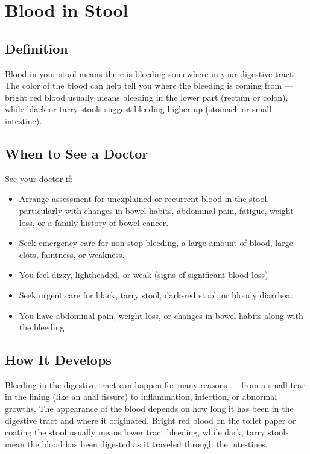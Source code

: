 \chapter{Blood in Stool}

\section*{Definition}
Blood in your stool means there is bleeding somewhere in your digestive tract. The color of the blood can help tell you where the bleeding is coming from — bright red blood usually means bleeding in the lower part (rectum or colon), while black or tarry stools suggest bleeding higher up (stomach or small intestine).

\section*{When to See a Doctor}
See your doctor if:
\begin{itemize}
  \item Arrange assessment for unexplained or recurrent blood in the stool, particularly with changes in bowel habits, abdominal pain, fatigue, weight loss, or a family history of bowel cancer.
  \item Seek emergency care for non-stop bleeding, a large amount of blood, large clots, faintness, or weakness.
  \item You feel dizzy, lightheaded, or weak (signs of significant blood loss)
  \item Seek urgent care for black, tarry stool, dark-red stool, or bloody diarrhea.
  \item You have abdominal pain, weight loss, or changes in bowel habits along with the bleeding
\end{itemize}

\section*{How It Develops}
Bleeding in the digestive tract can happen for many reasons — from a small tear in the lining (like an anal fissure) to inflammation, infection, or abnormal growths. The appearance of the blood depends on how long it has been in the digestive tract and where it originated. Bright red blood on the toilet paper or coating the stool usually means lower tract bleeding, while dark, tarry stools mean the blood has been digested as it traveled through the intestines.

